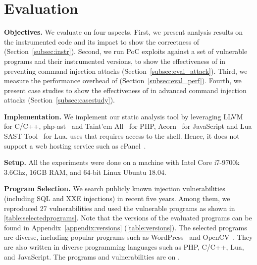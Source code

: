 \vspace{-0.5em}
\section{Evaluation}
\label{sec:eval}

\noindent
{\bf Objectives.} 
We evaluate \sysname on four aspects. 
First, we present analysis results on the instrumented code and its impact to show the correctness of \sysname (Section~\ref{subsec:instr}). 
Second, we run PoC exploits against a set of vulnerable programs and their \sysname instrumented versions, to show the effectiveness of \sysname in preventing command injection attacks (Section~\ref{subsec:eval_attack}).
Third, we measure the performance  overhead of \sysname (Section~\ref{subsec:eval_perf}).
Fourth, we present case studies to show the effectiveness of \sysname in advanced command injection attacks (Section~\ref{subsec:casestudy}).

\noindent
{\bf Implementation.}
We implement our static analysis tool by leveraging LLVM~\cite{llvm} for C/C++, php-ast~\cite{php-ast} and Taint'em All~\cite{taintall} for PHP, Acorn~\cite{js-ast} for JavaScript and Lua SAST Tool~\cite{costin2017lua} for Lua.
\sysname uses  that requires access to the shell. 
Hence, it does not support a web hosting service such as cPanel~\cite{cpanel}.

\noindent
{\bf Setup.} All the experiments were done on a machine with Intel Core i7-9700k 3.6Ghz, 16GB RAM, and 64-bit Linux Ubuntu 18.04.




\noindent
{\bf Program Selection.}
We search publicly known  injection vulnerabilities (including SQL and XXE injections) in recent five years. Among them, we reproduced 27 vulnerabilities and used the vulnerable programs as shown in \autoref{table:selectedprograms}. Note that the versions of the evaluated programs can be found in Appendix~\ref{appendix:versions} (\autoref{table:versions}).
The selected programs are diverse, including popular programs such as WordPress~\cite{wordpress} and OpenCV~\cite{opencv}.
They are also written in diverse programming languages such as PHP, C/C++, Lua, and JavaScript. 
The programs and vulnerabilities are on \cite{csr-tool}.


